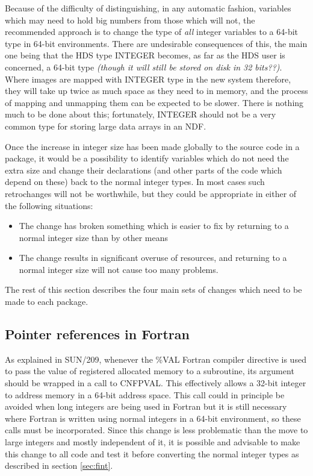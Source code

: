 \documentclass[twoside,11pt]{article}
\newcommand{\xref}[3]{#1}
\renewcommand{\_}{\texttt{\symbol{95}}}
\begin{document}
Because of the difficulty of distinguishing, in any automatic fashion,
variables which may 
need to hold big numbers from those which will not,
the recommended approach is to change the type of {\em all\/} 
integer variables to a 64-bit type in 64-bit environments.
There are undesirable consequences of this,
the main one being that 
the HDS type \_INTEGER becomes, as far as the HDS user is concerned,
a 64-bit type 
{\it (though it will still be stored on disk in 32 bits??)\/}.
Where images are mapped with \_INTEGER type in the new system therefore, 
they will take up twice as much space as they need to in memory,
and the process of mapping and unmapping them can be expected to be slower.
There is nothing much to be done about this;
fortunately, \_INTEGER should not be a very common type for
storing large data arrays in an NDF.

Once the increase in integer size has been made 
globally to the source code in a package,
it would be a possibility 
to identify variables which do not need the extra size
and change their declarations (and other parts of the code which depend
on these) back to the normal integer types.
In most cases such retrochanges will not be worthwhile, 
but they could be appropriate in either of the following situations:
\begin{itemize}
\item
The change has broken something which is easier to fix by returning to 
a normal integer size than by other means
\item
The change results in significant overuse of resources, 
and returning to a normal
integer size will not cause too many problems.
\end{itemize}

The rest of this section describes the four main sets of changes
which need to be made to each package.

\subsection{Pointer references in Fortran}

As explained in \xref{SUN/209}{sun209}{pointers},
whenever the \%VAL Fortran compiler directive 
is used to pass the value of registered allocated
memory to a subroutine, its argument should be wrapped in a call
to \xref{CNF\_PVAL}{sun209}{CNF\_PVAL}.  This effectively allows
a 32-bit integer to address memory in a 64-bit address space.
This call could in principle be avoided 
when long integers are being used in Fortran
but it is still 
necessary where Fortran is written using normal integers in a
64-bit environment,
so these calls must be incorporated.
Since this change is less problematic than the move to large integers
and mostly independent of it,
it is possible and advisable to make this
change to all code and test it before converting the normal integer types
as described in section \ref{sec:fint}.  
\end{document}

